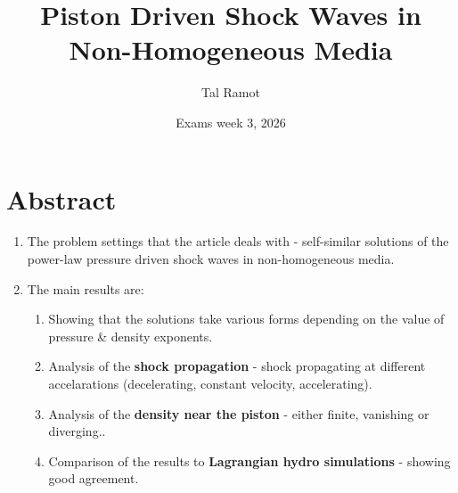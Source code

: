 \documentclass[11pt]{article}
\title{Piston Driven Shock Waves in Non-Homogeneous Media}
\author{Tal Ramot}
\date{Exams week 3, 2026}
\begin{document}
\maketitle

\section{Abstract}
\begin{enumerate}
  \item The problem settings that the article deals with - self-similar solutions of the power-law pressure driven shock waves in non-homogeneous media.
  \item The main results are:
  \begin{enumerate}
    \item Showing that the solutions take various forms depending on the value of pressure \& density exponents.
    \item Analysis of the \textbf{shock propagation} - shock propagating at different accelarations (decelerating, constant velocity, accelerating).
    \item Analysis of the \textbf{density near the piston} - either finite, vanishing or diverging..
    \item Comparison of the results to \textbf{Lagrangian hydro simulations} - showing good agreement.
  \end{enumerate}
\end{enumerate}
\end{document}
